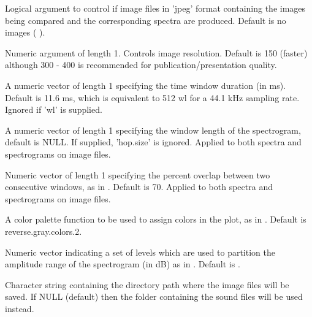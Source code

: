 \documentclass[letterpaper]{book}
\begin{document}
\begin{Arguments}
\begin{ldescription}
\item[\code{img}] Logical argument to control if image files in 'jpeg' format containing the images being compared and the corresponding spectra are produced. Default is no images ( ).

\item[\code{res}] Numeric argument of length 1. Controls image resolution. Default is 150 (faster) although 300 - 400 is recommended for publication/presentation quality.

\item[\code{hop.size}] A numeric vector of length 1 specifying the time window duration (in ms). Default is 11.6 ms, which is equivalent to 512 wl for a 44.1 kHz sampling rate. Ignored if 'wl' is supplied.

\item[\code{wl}] A numeric vector of length 1 specifying the window length of the spectrogram, default 
is NULL. If supplied, 'hop.size' is ignored. Applied to both spectra and spectrograms on image files.

\item[\code{ovlp}] Numeric vector of length 1 specifying the percent overlap between two 
consecutive windows, as in . Default is 70. Applied to both spectra and spectrograms on image files.

\item[\code{pal}] A color palette function to be used to assign colors in the 
plot, as in . Default is reverse.gray.colors.2.

\item[\code{collevels}] Numeric vector indicating a set of levels which are used to partition the amplitude range of the spectrogram (in dB) as in . Default is .

\item[\code{dest.path}] Character string containing the directory path where the image files will be saved. If NULL (default) then the folder containing the sound files will be used instead.
\end{ldescription}
\end{Arguments}
%
\end{document}

